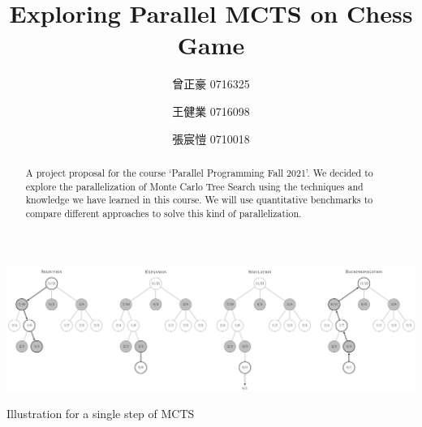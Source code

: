 \documentclass[sigconf]{acmart}
\begin{document}
\title{Exploring Parallel MCTS on Chess Game}


\author{曾正豪 0716325}

\author{王健業 0716098}

\author{張宸愷 0710018}





\begin{abstract}
  A project proposal for the course `Parallel Programming Fall 2021'.
  We decided to explore the parallelization of Monte Carlo Tree Search using the techniques and knowledge we have learned in this course. We will use quantitative benchmarks to compare different approaches to solve this kind of parallelization. 
\end{abstract}





\begin{teaserfigure}
  \includegraphics[width=\textwidth]{MCTS-steps.png}
  \caption{Illustration for a single step of MCTS}
\label{fig:teaser}
\end{teaserfigure}
\end{document}
